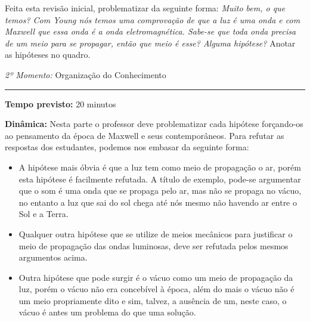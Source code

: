     Feita esta revisão inicial, problematizar da seguinte forma: \emph{Muito bem, o que temos? Com Young  nós temos uma comprovação de que a luz é uma onda e com Maxwell que essa onda é a onda eletromagnética. Sabe-se que toda onda precisa de um meio para se propagar, então que meio é esse? Alguma hipótese?} Anotar as hipóteses no quadro.
    


    \bigskip{}
    \noindent\emph{2º Momento:} Organização do Conhecimento
    \par\noindent\rule{.3\textwidth}{.5pt}  
    \par\noindent\textbf{Tempo previsto:} 20 minutos
    \smallskip
    \par\noindent\textbf{Dinâmica:} Nesta parte o professor deve problematizar cada hipótese forçando-os ao pensamento da época de Maxwell e seus contemporâneos. Para refutar as respostas dos estudantes, podemos nos embasar da seguinte forma:

    \begin{itemize}
        \item A hipótese mais óbvia é que a luz tem como meio de propagação o ar, porém esta hipótese é facilmente refutada. A título de exemplo, pode-se argumentar que o som é uma onda que se propaga pelo ar, mas não se propaga no vácuo, no entanto a luz que sai do sol chega até nós mesmo não havendo ar entre o Sol e a Terra.
        \item Qualquer outra hipótese que se utilize de meios mecânicos para justificar o meio de propagação das ondas luminosas, deve ser refutada pelos mesmos argumentos acima.
        \item Outra hipótese que pode surgir é o vácuo como um meio de propagação da luz, porém o vácuo não era concebível à época, além do mais o vácuo não é um meio propriamente dito e sim, talvez, a ausência de um, neste caso, o vácuo é antes um problema do que uma solução. 
    \end{itemize}

